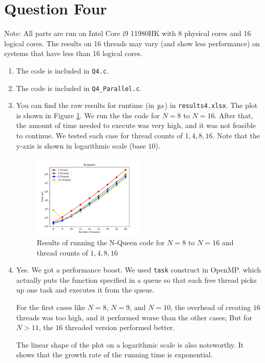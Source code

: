 \documentclass[12pt]{article}
\begin{document}
\newpage

\section{Question Four}

Note: All parts are run on Intel Core i9 11980HK with 8 physical cores and 16 logical cores. The results on 16 threads may vary (and show less performance) on systems that have less than 16 logical cores.

\begin{enumerate}[label=\alph*.]
	
	\item 
		The code is included in \Verb+Q4.c+.
	
	\item 
		The code is included in \Verb+Q4_Parallel.c+.
		
	\item 
	You can find the raw results for runtime (in $\micro s$) in \Verb+results4.xlsx+. The plot is shown in Figure \ref{fig:8}. We run the the code for $N=8$ to $N=16$. After that, the amount of time needed to execute was very high, and it was not feasible to continue. We tested each case for thread counts of $1,4,8,16$. Note that the y-axis is shown in logarithmic scale (base $10$).
	
	
	\begin{figure}[H]
		\centering
		\includegraphics[width=0.5\textwidth]{./images/Q4/N-Queen.png}	
		\cprotect\caption{Results of running the N-Queen code for $N=8$ to $N=16$ and thread counts of $1,4,8,16$}
		\label{fig:8}
	\end{figure}
	
	
	\item 
	Yes. We got a performance boost. We used \Verb+task+ construct in OpenMP. which actually puts the function specified in a queue so that each free thread picks up one task and executes it from the queue.

	For the first cases like $N=8$, $N=9$, and $N=10$, the overhead of creating $16$ threads was too high, and it performed worse than the other cases; But for $N>11$, the $16$ threaded version performed better. 
	
	The linear shape of the plot on a logarithmic scale is also noteworthy. It shows that the growth rate of the running time is exponential.
	
	
\end{enumerate}

\newpage
\end{document}
